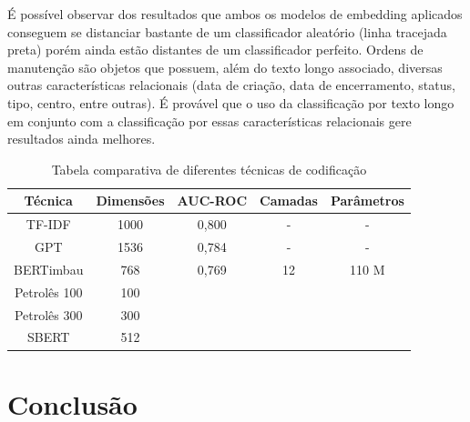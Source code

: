\documentclass[conference]{IEEEtran}
\begin{document}
    É possível observar dos resultados que ambos os modelos de embedding aplicados conseguem se distanciar bastante de um classificador aleatório (linha tracejada preta) porém ainda estão distantes de um classificador perfeito. Ordens de manutenção são objetos que possuem, além do texto longo associado, diversas outras características relacionais (data de criação, data de encerramento, status, tipo, centro, entre outras). É provável que o uso da classificação por texto longo em conjunto com a classificação por essas características relacionais gere resultados ainda melhores.
    
    \begin{table}
    \sffamily
    \footnotesize
        \centering
\caption{Tabela comparativa de diferentes técnicas de codificação}
\label{tab:my_label}
        \def\arraystretch{2}
        \begin{tabular}{|c|c|c|c|c|} \hline 
             Técnica&  Dimensões&  AUC-ROC & Camadas&Parâmetros\\ \hline 
             TF-IDF&  1000&  0,800 & -&-\\ \hline 
             GPT&  1536&  0,784 & -&-\\ \hline
 BERTimbau& 768&0,769 & 12&110 M\\\hline
 Petrolês 100& 100& & &\\\hline
 Petrolês 300& 300& & &\\\hline
 SBERT& 512& & &\\\hline
        \end{tabular}
        
    \end{table}
  
\section{Conclusão}
\end{document}
